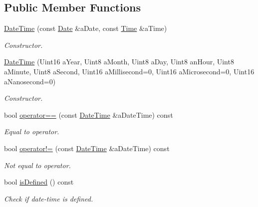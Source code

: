 \subsection*{Public Member Functions}
\begin{DoxyCompactItemize}
\item 
\hyperlink{classlibrary_1_1physics_1_1time_1_1_date_time_a4ea629e533f335c928e037c4ead4646e}{Date\+Time} (const \hyperlink{classlibrary_1_1physics_1_1time_1_1_date}{Date} \&a\+Date, const \hyperlink{classlibrary_1_1physics_1_1time_1_1_time}{Time} \&a\+Time)
\begin{DoxyCompactList}\small\item\em Constructor. \end{DoxyCompactList}\item 
\hyperlink{classlibrary_1_1physics_1_1time_1_1_date_time_a85b314387a775af714420bf1aa685b51}{Date\+Time} (Uint16 a\+Year, Uint8 a\+Month, Uint8 a\+Day, Uint8 an\+Hour, Uint8 a\+Minute, Uint8 a\+Second, Uint16 a\+Millisecond=0, Uint16 a\+Microsecond=0, Uint16 a\+Nanosecond=0)
\begin{DoxyCompactList}\small\item\em Constructor. \end{DoxyCompactList}\item 
bool \hyperlink{classlibrary_1_1physics_1_1time_1_1_date_time_a5b0e9a861247e7132cdd6880a7ec2381}{operator==} (const \hyperlink{classlibrary_1_1physics_1_1time_1_1_date_time}{Date\+Time} \&a\+Date\+Time) const
\begin{DoxyCompactList}\small\item\em Equal to operator. \end{DoxyCompactList}\item 
bool \hyperlink{classlibrary_1_1physics_1_1time_1_1_date_time_adb0937a46bac7d64307e52dc323e405e}{operator!=} (const \hyperlink{classlibrary_1_1physics_1_1time_1_1_date_time}{Date\+Time} \&a\+Date\+Time) const
\begin{DoxyCompactList}\small\item\em Not equal to operator. \end{DoxyCompactList}\item 
bool \hyperlink{classlibrary_1_1physics_1_1time_1_1_date_time_ae5726d0e5fd67f24af7b4fe66efd8a1f}{is\+Defined} () const
\begin{DoxyCompactList}\small\item\em Check if date-\/time is defined. \end{DoxyCompactList}\item 

\end{DoxyCompactItemize}
